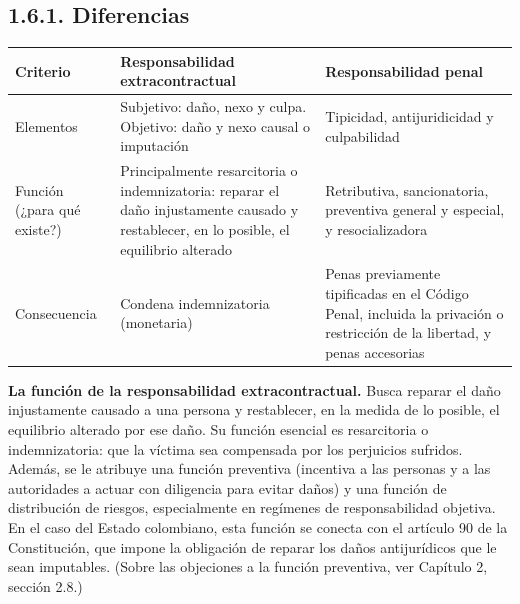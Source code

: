 \subsection{1.6.1. Diferencias}
\begin{tabla}
\begin{longtable}{|>{\raggedright\arraybackslash}m{}|>{\raggedright\arraybackslash}m{}|>{\raggedright\arraybackslash}m{}|}
\hline
\cellcolor[HTML]{1F3864}\textcolor[HTML]{FFFFFF}{\textbf{Criterio}} & \cellcolor[HTML]{1F3864}\textcolor[HTML]{FFFFFF}{\textbf{Responsabilidad extracontractual}} & \cellcolor[HTML]{1F3864}\textcolor[HTML]{FFFFFF}{\textbf{Responsabilidad penal}} \\ \hline
Elementos & Subjetivo: daño, nexo y culpa. Objetivo: daño y nexo causal o imputación & Tipicidad, antijuridicidad y culpabilidad \\ \hline
\cellcolor[HTML]{F2F5FA}Función (¿para qué existe?) & \cellcolor[HTML]{F2F5FA}Principalmente resarcitoria o indemnizatoria: reparar el daño injustamente causado y restablecer, en lo posible, el equilibrio alterado & \cellcolor[HTML]{F2F5FA}Retributiva, sancionatoria, preventiva general y especial, y resocializadora \\ \hline
Consecuencia & Condena indemnizatoria (monetaria) & Penas previamente tipificadas en el Código Penal, incluida la privación o restricción de la libertad, y penas accesorias \\ \hline
\end{longtable}
\end{tabla}
\textbf{La función de la responsabilidad extracontractual.} Busca reparar el daño injustamente causado a una persona y restablecer, en la medida de lo posible, el equilibrio alterado por ese daño. Su función esencial es resarcitoria o indemnizatoria: que la víctima sea compensada por los perjuicios sufridos. Además, se le atribuye una función preventiva (incentiva a las personas y a las autoridades a actuar con diligencia para evitar daños) y una función de distribución de riesgos, especialmente en regímenes de responsabilidad objetiva. En el caso del Estado colombiano, esta función se conecta con el artículo 90 de la Constitución, que impone la obligación de reparar los daños antijurídicos que le sean imputables. (Sobre las objeciones a la función preventiva, ver Capítulo 2, sección 2.8.)

